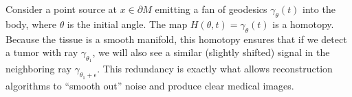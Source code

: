 \begin{example}
  Consider a point source at $x \in \partial M$ emitting a fan of geodesics $\gamma_\theta(t)$ into the body, where $\theta$ is the initial angle. The map $H(\theta, t) = \gamma_\theta(t)$ is a homotopy. Because the tissue is a smooth manifold, this homotopy ensures that if we detect a tumor with ray $\gamma_{\theta_1}$, we will also see a similar (slightly shifted) signal in the neighboring ray $\gamma_{\theta_1 + \epsilon}$. This redundancy is exactly what allows reconstruction algorithms to ``smooth out'' noise and produce clear medical images.
\end{example}
